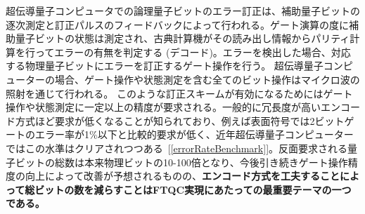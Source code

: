 \documentclass[11pt,a4j,dvipdfmx]{jarticle} 					%
\newcommand{\研究課題名}{誤り耐性量子コンピュータに向けた誤り訂正技術の開発(仮)}
\newcommand{\研究機関名}{東京大学}
\newcommand{\研究代表者氏名}{寺師弘二}
\newcommand{\研究期間の最終元号年度}{10}  %
\newcommand{\mybf}[1]{{\bfseries\sffamily#1}}
\begin{document}
%
超伝導量子コンピュータでの論理量子ビットのエラー訂正は、補助量子ビットの逐次測定と訂正パルスのフィードバックによって行われる。ゲート演算の度に補助量子ビットの状態は測定され、古典計算機がその読み出し情報からパリティ計算を行ってエラーの有無を判定する (デコード)。エラーを検出した場合、対応する物理量子ビットにエラーを訂正するゲート操作を行う。
超伝導量子コンピューターの場合、ゲート操作や状態測定を含む全てのビット操作はマイクロ波の照射を通じて行われる。
このような訂正スキームが有効になるためにはゲート操作や状態測定に一定以上の精度が要求される。一般的に冗長度が高いエンコード方式ほど要求が低くなることが知られており、例えば表面符号では2ビットゲートのエラー率が1\%以下と比較的要求が低く、近年超伝導量子コンピューターではこの水準はクリアされつつある~[\ref{errorRateBenchmark}]。反面要求される量子ビットの総数は本来物理ビットの10-100倍となり、今後引き続きゲート操作精度の向上によって改善が予想されるものの、\mybf{エンコード方式を工夫することによって総ビットの数を減らすことはFTQC実現にあたっての最重要テーマの一つである。} \\
\end{document}
